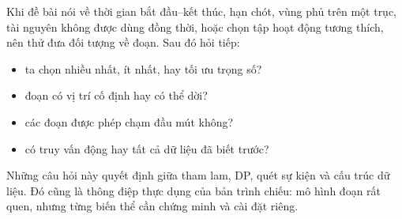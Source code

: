 \documentclass[11pt]{article}
\begin{document}
Khi đề bài nói về thời gian bắt đầu--kết thúc, hạn chót, vùng phủ trên một
trục, tài nguyên không được dùng đồng thời, hoặc chọn tập hoạt động tương
thích, nên thử đưa đối tượng về đoạn. Sau đó hỏi tiếp:
\begin{itemize}
  \item ta chọn nhiều nhất, ít nhất, hay tối ưu trọng số?
  \item đoạn có vị trí cố định hay có thể dời?
  \item các đoạn được phép chạm đầu mút không?
  \item có truy vấn động hay tất cả dữ liệu đã biết trước?
\end{itemize}
Những câu hỏi này quyết định giữa tham lam, DP, quét sự kiện và cấu trúc dữ
liệu. Đó cũng là thông điệp thực dụng của bản trình chiếu: mô hình đoạn rất
quen, nhưng từng biến thể cần chứng minh và cài đặt riêng.
\end{document}
